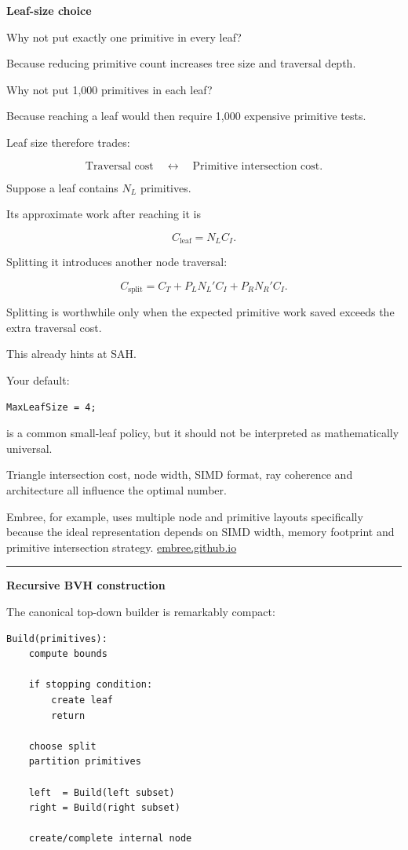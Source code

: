 \textbf{Leaf-size choice}

Why not put exactly one primitive in every leaf?

Because reducing primitive count increases tree size and traversal depth.

Why not put 1,000 primitives in each leaf?

Because reaching a leaf would then require 1,000 expensive primitive tests.

Leaf size therefore trades:

\[
\text{Traversal cost}
\quad\leftrightarrow\quad
\text{Primitive intersection cost}.
\]

Suppose a leaf contains \(N_L\) primitives.

Its approximate work after reaching it is

\[
C_{\text{leaf}}
=
N_L C_I.
\]

Splitting it introduces another node traversal:

\[
C_{\text{split}}
=
C_T
+
P_L N_L'C_I
+
P_R N_R'C_I.
\]

Splitting is worthwhile only when the expected primitive work saved exceeds the extra traversal cost.

This already hints at SAH.

Your default:

\begin{verbatim}
MaxLeafSize = 4;
\end{verbatim}

is a common small-leaf policy, but it should not be interpreted as mathematically universal.

Triangle intersection cost, node width, SIMD format, ray coherence and architecture all influence the optimal number.

Embree, for example, uses multiple node and primitive layouts specifically because the ideal representation depends on SIMD width, memory footprint and primitive intersection strategy. \href{https://embree.github.io/papers/2014-Siggraph-Embree.pdf?utm_source=chatgpt.com}{embree.github.io}

\begin{center}\rule{0.5\linewidth}{0.5pt}\end{center}

\textbf{Recursive BVH construction}

The canonical top-down builder is remarkably compact:

\begin{verbatim}
Build(primitives):
    compute bounds

    if stopping condition:
        create leaf
        return

    choose split
    partition primitives

    left  = Build(left subset)
    right = Build(right subset)

    create/complete internal node
\end{verbatim}

